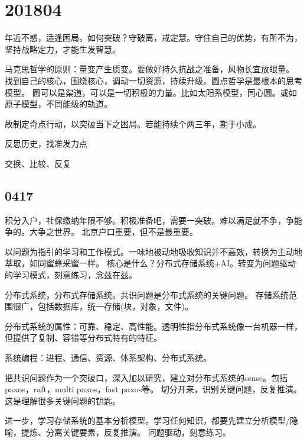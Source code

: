\section{201804}

年近不惑，适逢困局。如何突破？守破离，戒定慧。守住自己的优势，有所不为，
坚持战略定力，才能生发智慧。

马克思哲学的原则：量变产生质变。要做好持久抗战之准备，风物长宜放眼量。
找到自己的核心，围绕核心，调动一切资源，持续升级。圆点哲学是最根本的思考模型。
圆可以是渠道，可以是一切积极的力量。比如太阳系模型，同心圆。或如原子模型，不同能级的轨道。

故制定奇点行动，以突破当下之困局。若能持续个两三年，期于小成。

\begin{compactenum}
\item 反思历史，找准发力点
\item 交换、比较、反复
\end{compactenum}

\subsection{0417}

积分入户，社保缴纳年限不够。积极准备吧，需要一突破。难以满足就不争，争能争的。大争之世界。
北京户口重要，但不是最重要。

以问题为指引的学习和工作模式。一味地被动地吸收知识并不高效，转换为主动地萃取，如同蜜蜂采蜜一样。
核心是什么？分布式存储系统+AI。转变为问题驱动的学习模式，刻意练习，念兹在兹。

分布式系统，分布式存储系统。共识问题是分布式系统的关键问题。
存储系统范围很广，包括数据库，统一存储(块，对象，文件)。

分布式系统的属性：可靠、稳定、高性能。透明性指分布式系统像一台机器一样，但提供了复制、容错等分布式特有的特征。

系统编程：进程、通信、资源、体系架构、分布式系统。

把共识问题作为一个突破口，深入加以研究，建立对分布式系统的sense。包括paxos，raft，multi paxos，fast paxos等。
切分开来，识别关键问题，反复推演。这是理解很多关键问题的钥匙。

进一步，学习存储系统的基本分析模型。学习任何知识，都要先建立分析模型/隐喻，提炼、分离关键要素，反复推演。
问题驱动，刻意练习。
